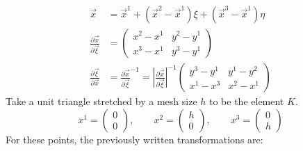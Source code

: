 \begin{align}
	\vec{x}                                     & = \vec{x}^1 + ( \vec{x}^2 - \vec{x}^1)\xi + ( \vec{x}^3 - \vec{x}^1)\eta                                                                       \\[1em]
	\frac{\partial \vec{x}}{\partial \vec{\xi}} & = \begin{pmatrix}
		                                                x^2 - x^1 & y^2 - y^1 \\
		                                                x^3 - x^1 & y^3 - y^1
	                                                \end{pmatrix}                                                                                                                        \\[1em]
	\frac{\partial \vec{\xi}}{\partial \vec{x}} & = \frac{\partial \vec{x}}{\partial \vec{\xi}}^{-1} = \left|\frac{\partial \vec{x}}{\partial \vec{\xi}}\right|^{-1}\begin{pmatrix}
		                                                                                                                                                                y^3 - y^1 & y^1 - y^2 \\[1em]
		                                                                                                                                                                x^1 - x^3 & x^2 - x^1
	                                                                                                                                                                \end{pmatrix}
\end{align}
Take a unit triangle stretched by a mesh size $h$ to be the element $K$.
\begin{equation*}
	x^1 = \begin{pmatrix}
		0 \\
		0
	\end{pmatrix},\qquad
	x^2 = \begin{pmatrix}
		h \\
		0
	\end{pmatrix},\qquad
	x^3 = \begin{pmatrix}
		0 \\
		h
	\end{pmatrix}
\end{equation*}
For these points, the previously written transformations are:
